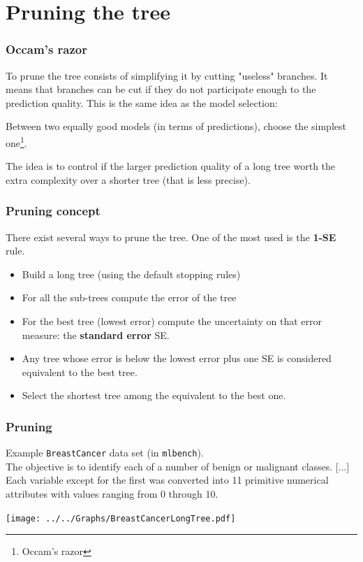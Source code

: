 \section{Pruning the tree}
\begin{frame}
\frametitle{Occam's razor}
To prune the tree consists of simplifying it by cutting "useless" branches. It means that branches can be cut if they do not participate enough to the prediction quality. This is the same idea as the model selection: 
\begin{center}
Between two equally good models (in terms of predictions), choose the simplest one\footnote{Occam's razor}.
\end{center}
The idea is to control if the larger prediction quality of a long tree worth the extra complexity over a shorter tree (that is less precise). 
\end{frame}
\begin{frame}
\frametitle{Pruning concept}
There exist several ways to prune the tree. One of the most used is the {\bf 1-SE} rule. 
\begin{itemize}
\item Build a long tree (using the default stopping rules)
\item For all the sub-trees compute the error of the tree 
\item For the best tree (lowest error) compute the uncertainty on that error measure: the {\bf standard error} SE.
\item Any tree whose error is below the lowest error plus one SE is considered equivalent to the best tree.
\item Select the shortest tree among the equivalent to the best one.
\end{itemize}
\end{frame}
\begin{frame}
\frametitle{Pruning}
Example {\tt BreastCancer} data set (in {\tt mlbench}).\\
\scriptsize
The objective is to identify each of a number of benign or malignant classes. [...] Each variable except for the first was converted into 11 primitive numerical attributes with values ranging from 0 through 10. 
\normalsize
\begin{center}
\texttt{[image: ../../Graphs/BreastCancerLongTree.pdf]}
\end{center}
\end{frame}
